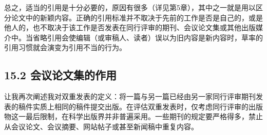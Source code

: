 总之，适当的引用是十分必要的，原因有很多（详见第5章），其中之一就是用以区分论文中的新颖内容。正确的引用标准并不取决于先前的工作是否是自己的，或是他人的，也不取决于该工作是否发表在同行评审的期刊、会议论文集或其他出版媒介中。当省略引用会使编辑（或审稿人、读者）误以为旧内容是新内容时，草率的引用习惯就会演变为引用不当的行为。

\subsection*{15.2 会议论文集的作用}
让我再次阐述我对双重发表的定义：将一篇与另一篇已经由另一家同行评审期刊发表的稿件实质上相同的稿件提交出版。在评估双重发表时，仅考虑同行评审的出版物这一最后限制，在科学出版界并非普遍采用。一些期刊的规定要严格得多，禁止从会议论文、会议摘要、网站帖子或甚至新闻稿中重复内容。

